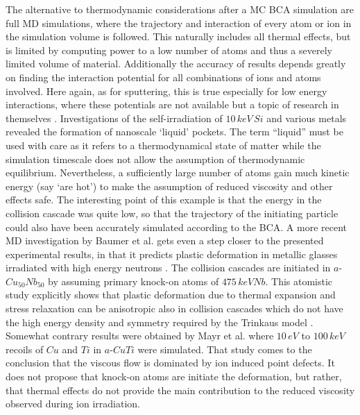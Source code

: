 The alternative to thermodynamic considerations after a MC BCA simulation are full MD simulations, where the trajectory and interaction of every atom or ion in the simulation volume is followed. This naturally includes all thermal effects, but is limited by computing power to a low number of atoms and thus a severely limited volume of material. Additionally the accuracy of results depends greatly on finding the interaction potential for all combinations of ions and atoms involved. Here again, as for sputtering, this is true especially for low energy interactions, where these potentials are not available but a topic of research in themselves \cite{primetzhofer_inelastic_2012,primetzhofer_local_2013}. Investigations of the self-irradiation of $10\,keV\,Si$ and various metals \cite{nordlund_defect_1998} revealed the formation of nanoscale `liquid' pockets. The term ``liquid'' must be used with care as it refers to a thermodynamical state of matter while the simulation timescale does not allow the assumption of thermodynamic equilibrium. Nevertheless, a sufficiently large number of atoms gain much kinetic energy (say `are hot') to make the assumption of reduced viscosity and other effects safe. The interesting point of this example is that the energy in the collision cascade was quite low, so that the trajectory of the initiating particle could also have been accurately simulated according to the BCA. A more recent MD investigation by Baumer et al. gets even a step closer to the presented experimental results, in that it predicts plastic deformation in metallic glasses irradiated with high energy neutrons \cite{baumer_prediction_2014}. The collision cascades are initiated in $a$-$Cu_{50}Nb_{50}$ by assuming primary knock-on atoms of $475\,keV Nb$. This atomistic study explicitly shows that plastic deformation due to thermal expansion and stress relaxation can be anisotropic also in collision cascades which do not have the high energy density and symmetry required by the Trinkaus model \cite{trinkaus_viscoelastic_1995}. Somewhat contrary results were obtained by Mayr et al. \cite{mayr_mechanisms_2003} where $10\,eV$ to $100\,keV$ recoils of $Cu$ and $Ti$ in $a$-$CuTi$ were simulated. That study comes to the conclusion that the viscous flow is dominated by ion induced point defects. It does not propose that knock-on atoms are initiate the deformation, but rather, that thermal effects do not provide the main contribution to the reduced viscosity observed during ion irradiation.


